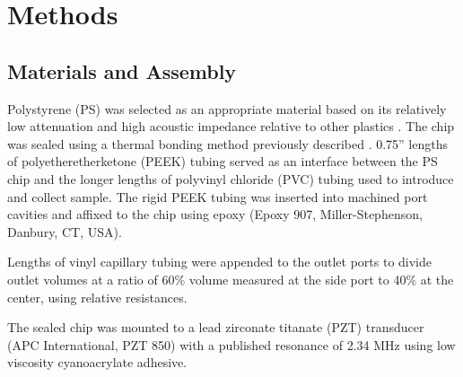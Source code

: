 \section{Methods}
\label{sec:methods}

\subsection{Materials and Assembly}
Polystyrene (PS) was selected as an appropriate material based on its relatively low attenuation and high acoustic impedance relative to other plastics \cite{mueller2013continuous}\cite{selfridge1985approximate}. The chip was sealed using a thermal bonding method previously described \cite{mueller2013continuous}. 0.75'' lengths of polyetheretherketone (PEEK) tubing served as an interface between the PS chip and the longer lengths of polyvinyl chloride (PVC) tubing used to introduce and collect sample. The rigid PEEK tubing was inserted into machined port cavities and affixed to the chip using epoxy (Epoxy 907, Miller-Stephenson, Danbury, CT, USA). 

Lengths of vinyl capillary tubing  were appended to the outlet ports to divide outlet volumes at a ratio of 60\% volume measured at the side port to 40\% at the center, using relative resistances. 


The sealed chip was mounted to a lead zirconate titanate (PZT) transducer (APC International, PZT 850) with a published resonance of 2.34 MHz using low viscosity cyanoacrylate adhesive.  

